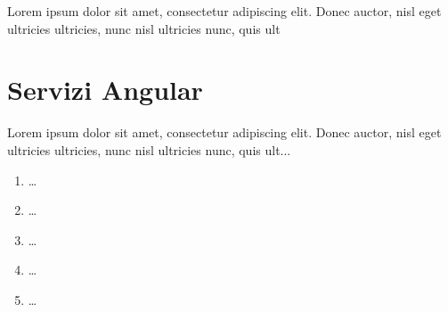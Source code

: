 Lorem ipsum dolor sit amet, consectetur adipiscing elit. Donec auctor, nisl eget ultricies ultricies, nunc nisl ultricies nunc, quis ult

\section{Servizi Angular}
Lorem ipsum dolor sit amet, consectetur adipiscing elit. Donec auctor, nisl eget ultricies ultricies, nunc nisl ultricies nunc, quis ult...

\begin{enumerate}
    \item \dots
    \item \dots
    \item \dots
    \item \dots
    \item \dots
\end{enumerate}

